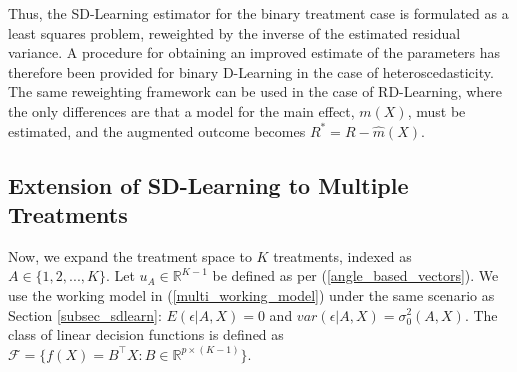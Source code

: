 \documentclass[useAMS,usenatbib]{biom}
\begin{document}
Thus, the SD-Learning estimator for the binary treatment case is formulated as a least squares problem, reweighted by the inverse of the estimated residual variance. A procedure for obtaining an improved estimate of the parameters has therefore been provided for binary D-Learning in the case of heteroscedasticity. The same reweighting framework can be used in the case of RD-Learning, where the only differences are that a model for the main effect, $m(X)$, must be estimated, and the augmented outcome becomes $R^* = R - \hat{m}(X)$.

\subsection{Extension of SD-Learning to Multiple Treatments} \label{subsec_sdlearn_multi}

Now, we expand the treatment space to $K$ treatments, indexed as $A \in \{ 1, 2, ..., K \}$. Let $u_A \in \mathbb{R}^{K-1}$ be defined as per (\ref{angle_based_vectors}). We use the working model in (\ref{multi_working_model}) under the same scenario as Section \ref{subsec_sdlearn}: $E(\epsilon|A,X) = 0$ and $var(\epsilon|A,X) = \sigma_0^2(A,X)$. The class of linear decision functions is defined as $\mathcal{F} = \{ f(X) = B^{\top}X : B \in \mathbb{R}^{p \times (K-1)} \}$.
\end{document}
